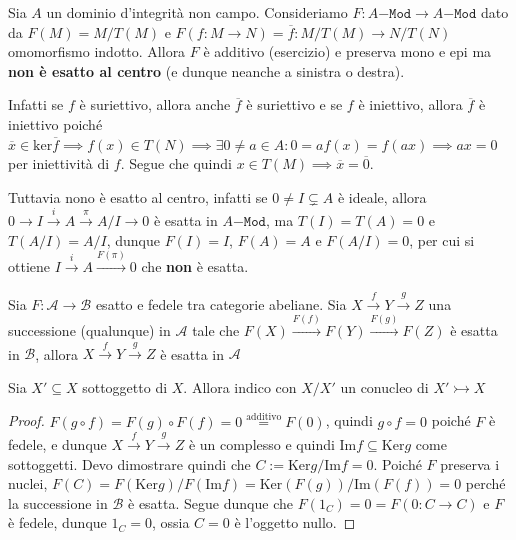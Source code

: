 \begin{example}{}
    Sia \(A\) un dominio d'integrità non campo. Consideriamo \(F : A\mathtt{-Mod} \to A\mathtt{-Mod}\) dato da \(F{(M)} ={M}/{T{(M)}}\) e \(
    F{(f : M\to N)} = \overline{f} : M / T{(M)} \to N / T{(N)}\) omomorfismo
    indotto. Allora \(F\) è additivo (esercizio) e preserva mono e epi ma \textbf{non è esatto al centro} (e dunque neanche a sinistra o destra).

    Infatti se \(f\) è suriettivo, allora anche \(\overline{f}\) è suriettivo e se \(f\) è iniettivo, allora \(\overline{f}\) è iniettivo poiché \(\overline{x} \in \mathrm{ker}\overline{f} \implies f{(x)} \in T{(N)} \implies \exists 0 \neq a \in A : 0 = a f{(x)} = f{(ax)} \implies ax = 0 \) per iniettività di \(f\). Segue che quindi \(x \in T{(M)} \implies \overline{x} = \overline{0}\).

    Tuttavia nono è esatto al centro, infatti se \(
    0 \neq I \subsetneq A\) è ideale, allora \(
    0 \to I \overset{i}{\to} A \overset{\pi}{\to} A / I \to 0\) è esatta in \(A\mathtt{-Mod}\), ma \(T{(I)} = T{(A)} = 0 \) e \(T{(A / I)} = A / I\), dunque \(F{(I)} = I\), \(F{(A)}=A\) e \(F{(A / I)} = 0\), per cui si ottiene \(I \overset{i}{\to} A \overset{F{(\pi)}}{\to} 0\) che \textbf{non} è esatta.
\end{example}

\begin{proposition}{}
    Sia \(F: \mathcal{A} \to \mathcal{B}\) esatto e fedele tra categorie
    abeliane. Sia \(X \overset{f}{\to} Y \overset{g}{\to} Z\) una successione
    (qualunque) in \(\mathcal{A}\) tale che \(F{(X)} \overset{F{(f)}}{\to} F{(Y)} \overset{F{(g)}}{\to} F{(Z)}\) è esatta in \(\mathcal{B}\), allora \(X \overset{f}{\to} Y \overset{g}{\to}  Z\) è esatta in \(\mathcal{A}\)
\end{proposition}

\begin{note}[zione]
    Sia \(X' \subseteq X\) sottoggetto di \(X\). Allora indico con \(X / X'\) un
    conucleo di \(X' \rightarrowtail X\) 
\end{note}

\begin{proof}{}
    \(F{(g \circ f)} = F{(g)} \circ F{(f)} = 0 \overset{\text{additivo}}{=}F{(0)}\), quindi \(
    g \circ f = 0\) poiché \(F\) è fedele, e dunque \(
    X \overset{f}{\to} Y \overset{g}{\to} Z\) è un complesso e quindi \(\mathrm{Im}f \subseteq \mathrm{Ker}g \) come sottoggetti.
    Devo dimostrare quindi che \(C := \mathrm{Ker}g / \mathrm{Im}f = 0\). Poiché
    \(F\) preserva i nuclei, \(F{(C)} = F{(\mathrm{Ker}g)} / F{(\mathrm{Im}f)} = \mathrm{Ker}{(F{(g)})} / \mathrm{Im}{(F{(f)})} = 0\) perché la successione in \(\mathcal{B}\) è esatta. Segue dunque che \(F{(1_C)} = 0 = F{(0 : C \to C)}\) e \(F\) è fedele, dunque \(1_C = 0\), ossia \(C=0\) è l'oggetto nullo.
\end{proof}

